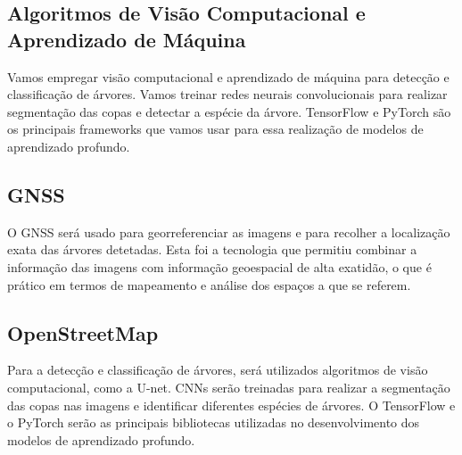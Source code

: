 \documentclass[
    12pt,                   %
    openright,              %
    oneside,                %
    a4paper,                %
    sumario=tradicional,    %
    english,                %
    brazil,                 %
    ]{abntex2}
\begin{document}
\subsection{Algoritmos de Visão Computacional e Aprendizado de Máquina}
    Vamos empregar visão computacional e aprendizado de máquina para detecção e classificação de árvores. Vamos treinar redes neurais convolucionais para realizar segmentação das copas e detectar a espécie da árvore. TensorFlow e PyTorch são os principais frameworks que vamos usar para essa realização de modelos de aprendizado profundo.

\subsection{GNSS}
    O GNSS será usado para georreferenciar as imagens e para recolher a localização exata das árvores detetadas. Esta foi a tecnologia que permitiu combinar a informação das imagens com informação geoespacial de alta exatidão, o que é prático em termos de mapeamento e análise dos espaços a que se referem.

\subsection{OpenStreetMap}
    Para a detecção e classificação de árvores, será utilizados algoritmos de visão computacional, como a U-net. CNNs serão treinadas para realizar a segmentação das copas nas imagens e identificar diferentes espécies de árvores. O TensorFlow e o PyTorch serão as principais bibliotecas utilizadas no desenvolvimento dos modelos de aprendizado profundo.
\end{document}
